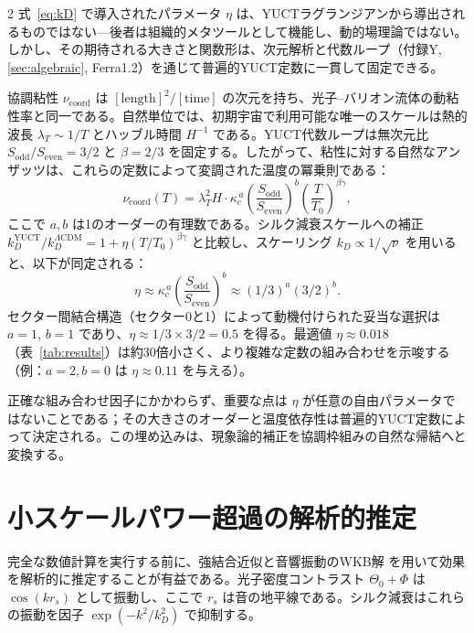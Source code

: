 \documentclass[11pt,a4paper]{article}
\begin{document}
\begin{multicols}{2}
		式~\eqref{eq:kD} で導入されたパラメータ \(\eta\) は、YUCTラグランジアンから導出されるものではない—後者は組織的メタツールとして機能し、動的場理論ではない。しかし、その期待される大きさと関数形は、次元解析と代数ループ（付録Y, \ref{sec:algebraic}, Ferra1.2）を通じて普遍的YUCT定数に一貫して固定できる。
		
		協調粘性 \(\nu_{\mathrm{coord}}\) は \([\mathrm{length}]^2/[\mathrm{time}]\) の次元を持ち、光子–バリオン流体の動粘性率と同一である。自然単位では、初期宇宙で利用可能な唯一のスケールは熱的波長 \(\lambda_T \sim 1/T\) とハッブル時間 \(H^{-1}\) である。YUCT代数ループは無次元比 \(S_{\mathrm{odd}}/S_{\mathrm{even}} = 3/2\) と \(\beta = 2/3\) を固定する。したがって、粘性に対する自然なアンザッツは、これらの定数によって変調された温度の冪乗則である：
		\begin{equation}
			\nu_{\mathrm{coord}}(T) = \lambda_T^2 H \cdot \kappa_c^{\,a} \left(\frac{S_{\mathrm{odd}}}{S_{\mathrm{even}}}\right)^b \left(\frac{T}{T_0}\right)^{\beta\gamma},
		\end{equation}
		ここで \(a,b\) は1のオーダーの有理数である。シルク減衰スケールへの補正 \(k_D^{\mathrm{YUCT}}/k_D^{\Lambda\mathrm{CDM}} = 1 + \eta (T/T_0)^{\beta\gamma}\) と比較し、スケーリング \(k_D \propto 1/\sqrt{\nu}\) を用いると、以下が同定される：
		\begin{equation}
			\eta \approx \kappa_c^{\,a} \left(\frac{S_{\mathrm{odd}}}{S_{\mathrm{even}}}\right)^b \approx (1/3)^a (3/2)^b.
		\end{equation}
		セクター間結合構造（セクター0と1）によって動機付けられた妥当な選択は \(a=1\), \(b=1\) であり、\(\eta \approx 1/3 \times 3/2 = 0.5\) を得る。最適値 \(\eta \approx 0.018\)（表~\ref{tab:results}）は約30倍小さく、より複雑な定数の組み合わせを示唆する（例：\(a=2, b=0\) は \(\eta \approx 0.11\) を与える）。
		
		正確な組み合わせ因子にかかわらず、重要な点は \(\eta\) が任意の自由パラメータではないことである；その大きさのオーダーと温度依存性は普遍的YUCT定数によって決定される。この埋め込みは、現象論的補正を協調枠組みの自然な帰結へと変換する。
		
		\section{小スケールパワー超過の解析的推定}
		
		完全な数値計算を実行する前に、強結合近似と音響振動のWKB解 \cite{Hu1995} を用いて効果を解析的に推定することが有益である。光子密度コントラスト \(\Theta_0 + \Phi\) は \(\cos(k r_s)\) として振動し、ここで \(r_s\) は音の地平線である。シルク減衰はこれらの振動を因子 \(\exp(-k^2/k_D^2)\) で抑制する。
		

\end{multicols}
\end{document}
